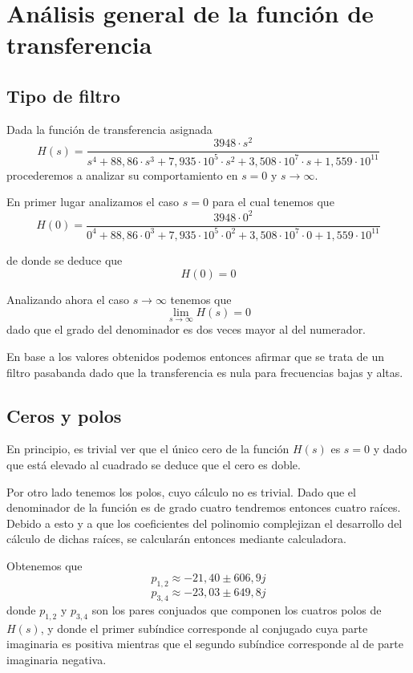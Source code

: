 \documentclass[11pt,a4paper]{report}
\author{Marcos}
\begin{document}

\section*{Análisis general de la función de transferencia}

\subsection*{Tipo de filtro}

Dada la función de transferencia asignada
\[H(s)=\frac{3948 \cdot s^2}{s^4+88,86 \cdot s^3+7,935 \cdot 10^5 \cdot s^2+3,508 \cdot 10^7 \cdot s+1,559 \cdot 10^{11}}\]
procederemos a analizar su comportamiento en $s=0$ y $s\longrightarrow\infty$.

\bigskip
En primer lugar analizamos el caso $s=0$ para el cual tenemos que 
\[H(0) = \frac{3948 \cdot 0^2}{0^4+88,86 \cdot 0^3+7,935 \cdot 10^5 \cdot 0^2+3,508 \cdot 10^7 \cdot 0+1,559 \cdot 10^{11}}\]

de donde se deduce que
\[H(0) = 0\]

Analizando ahora el caso $s\longrightarrow\infty$ tenemos que
\[\lim_{s \to \infty} H(s) = 0\]
dado que el grado del denominador es dos veces mayor al del numerador.

\bigskip
En base a los valores obtenidos podemos entonces afirmar que se trata de un
filtro pasabanda dado que la transferencia es nula para frecuencias bajas y altas.

\subsection*{Ceros y polos}

En principio, es trivial ver que el único cero de la función $H(s)$ es
$s = 0$ y dado que está elevado al cuadrado se deduce que el cero es doble.

\bigskip
Por otro lado tenemos los polos, cuyo cálculo no es trivial. Dado que el denominador de la función es de grado cuatro tendremos entonces cuatro raíces. Debido a esto
y a que los coeficientes del polinomio complejizan el desarrollo del cálculo de 
dichas raíces, se calcularán entonces mediante calculadora. 

\bigskip
Obtenemos que
\[p_{1,2} \approx -21,40 \pm 606,9j\]
\[p_{3,4} \approx -23,03 \pm 649,8j\]
donde $p_{1,2}$ y $p_{3,4}$ son los pares conjuados que componen los cuatros
polos de $H(s)$, y donde el primer subíndice corresponde al conjugado cuya parte imaginaria es positiva mientras que el segundo subíndice corresponde al de parte imaginaria negativa.
\end{document}
